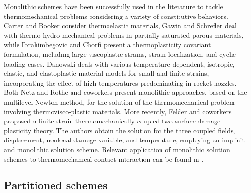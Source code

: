 Monolithic schemes have been successfully  used in the literature to tackle thermomechanical problems considering a variety of constitutive behaviors.
Carter and Booker \citep{carter_finite_1989} consider thermoelastic materials, Gawin and Schrefler \citep{gawinThermoHydroMechanical1996} deal with thermo-hydro-mechanical problems in partially saturated porous materials, while Ibrahimbegovic and Chorfi \citep{ibrahimbegovic_covariant_2002} present a thermoplasticity covariant formulation, including large viscoplastic strains, strain localization, and cyclic loading cases.
Danowski \citep{danowski_computational_2014} deals with various temperature-dependent, isotropic, elastic, and elastoplastic material models for small and finite strains, incorporating the effect of high temperatures predominating in rocket nozzles.
Both Netz \citep{netz_high-order_2013} and Rothe and coworkers \citep{rothe_monolithic_2015} present monolithic approaches, based on the multilevel Newton method, for the solution of the thermomechanical problem involving thermovisco-plastic materials.
More recently, Felder and coworkers \citep{felder_thermomechanically_2021} proposed a finite strain thermomechanically coupled two-surface damage-plasticity theory.
The authors obtain the solution for the three coupled fields, displacement, nonlocal damage variable, and temperature, employing an implicit and monolithic solution scheme.
Relevant application of monolithic solution schemes to thermomechanical contact interaction can be found in \citet{zavarise1992RealContactMechanisms,wriggers1993ThermomechanicalContactRigorous,oancea1997FiniteElementFormulation,hueber2009ThermomechanicalContactProblems,dittmann2014IsogeometricAnalysisThermomechanical,seitz2018ComputationalApproachThermoelastoplastic}.

\subsection{Partitioned schemes}
\label{sec:partitioned-schemes}

